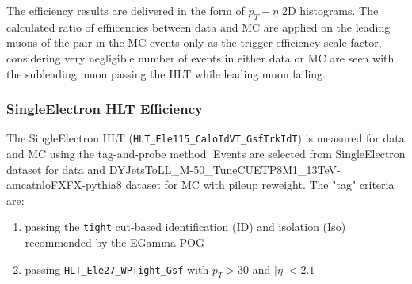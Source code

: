 \vspace{0.3cm}
The efficiency results are delivered in the form of $p_T - \eta$ 2D histograms. The calculated ratio of effiicencies between data and MC are applied on the leading muons of the pair in the MC events only as the trigger efficiency scale factor, considering very negligible number of events in either data or MC are seen with the subleading muon passing the HLT while leading muon failing.

\subsubsection{SingleElectron HLT Efficiency}
The SingleElectron HLT (\texttt{HLT\_Ele115\_CaloIdVT\_GsfTrkIdT}) is measured for data and MC using the tag-and-probe method. Events are selected from SingleElectron dataset for data and DYJetsToLL\_M-50\_TuneCUETP8M1\_13TeV-amcatnloFXFX-pythia8 dataset for MC with pileup reweight. The "tag" criteria are:
\begin{enumerate}
\item passing the \texttt{tight} cut-based identification (ID) and isolation (Iso) recommended by the EGamma POG %
\item passing \texttt{HLT\_Ele27\_WPTight\_Gsf} with $p_T>30$ and $|\eta|<2.1$
\end{enumerate}


